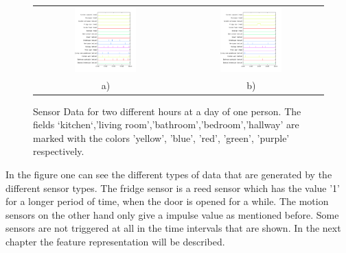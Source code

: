 \begin{figure}[h!]
   \centering
   \begin{tabular}{c c}
    \includegraphics[width=0.45\textwidth]{Pictures/SensorsMorningHN3Day34.png} & \includegraphics[width=0.45\textwidth]{Pictures/SensorsNoonHN3Day34.png}\\
    a) & b)
   \end{tabular}
   \caption{Sensor Data for two different hours at a day of one person. The fields `kitchen`,'living room','bathroom','bedroom','hallway' are marked with the colors 'yellow', 'blue', 'red', 'green', 'purple' respectively.}
   \label{fig:PlaineSensorData}
 \end{figure}


   

In the figure one can see the different types of data that are generated by the different sensor types. The fridge sensor is a reed sensor which has the value '1' for a longer period of time, when the door is opened for a while. The motion sensors on the other hand only give a impulse value as mentioned before. Some sensors are not triggered at all in the time intervals that are shown.
In the next chapter the feature representation will be described.\\
